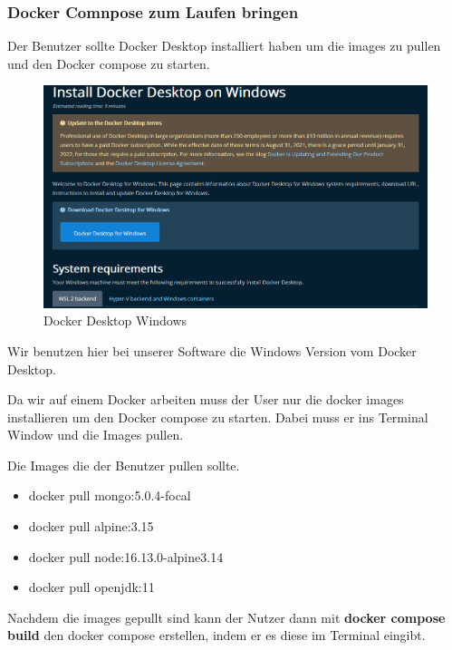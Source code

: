 \subsubsection{Docker Comnpose zum Laufen bringen}
Der Benutzer sollte Docker Desktop installiert haben um die images zu pullen und den Docker compose zu starten.

\begin{figure}[H]
    \centering
    \includegraphics[width=1.0\textwidth]{bilder/installationshandbuch/Docker_Desktop.PNG}
    \caption{Docker Desktop Windows}
    \label{fig:Docker_Desktop_Windows}
\end{figure}
\noindent Wir benutzen hier bei unserer Software die Windows Version vom Docker Desktop.\newline

\noindent Da wir auf einem Docker arbeiten muss der User nur die docker images installieren um den Docker compose zu starten.\newline
Dabei muss er ins Terminal Window und die Images pullen.\newline


\noindent Die Images die der Benutzer pullen sollte.

\begin{itemize}
    \item docker pull mongo:5.0.4-focal
    \item docker pull alpine:3.15
    \item docker pull node:16.13.0-alpine3.14
    \item docker pull openjdk:11
\end{itemize}

\noindent Nachdem die images gepullt sind kann der Nutzer dann mit \textbf{docker compose build} den docker compose erstellen, indem er es diese 
im Terminal eingibt.\newline

